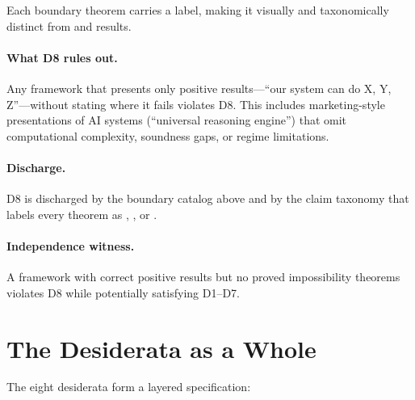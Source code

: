 \noindent
Each boundary theorem carries a \claimBoundary{} label, making it
visually and taxonomically distinct from \claimCore{} and
\claimConditional{} results.

\paragraph{What D8 rules out.}
Any framework that presents only positive results---``our system can
do X, Y, Z''---without stating where it fails violates D8.  This
includes marketing-style presentations of AI systems (``universal
reasoning engine'') that omit computational complexity, soundness
gaps, or regime limitations.

\paragraph{Discharge.}
D8 is discharged by the boundary catalog above and by the claim
taxonomy that labels every theorem as \claimCore{}, \claimConditional{},
or \claimBoundary{}.

\paragraph{Independence witness.}
A framework with correct positive results but no proved impossibility
theorems violates D8 while potentially satisfying D1--D7.


\section{The Desiderata as a Whole}
\label{sec:desiderata-summary}

The eight desiderata form a layered specification:

